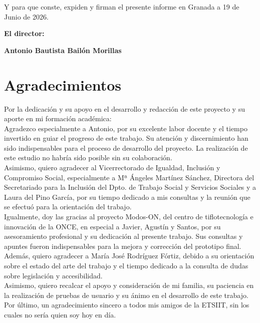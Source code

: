 \vspace{0.5cm}

Y para que conste, expiden y firman el presente informe en Granada a 19 de Junio de 2026.

\vspace{1cm}

\textbf{El director: }

\vspace{5cm}

\noindent \textbf{Antonio Bautista Bailón Morillas}
\newpage
\thispagestyle{empty}
\chapter*{Agradecimientos}

\thispagestyle{empty}
Por la dedicación y su apoyo en el desarrollo y redacción de este proyecto y su aporte en mi formación académica:\\

Agradezco especialmente a Antonio, por su excelente labor docente y el tiempo invertido en guiar el progreso de este trabajo. Su atención y discernimiento han sido indispensables para el proceso de desarrollo del proyecto. La realización de este estudio no habría sido posible sin su colaboración.\\

Asimismo, quiero agradecer al Vicerrectorado de Igualdad, Inclusión y Compromiso Social, especialmente a Mª Ángeles Martínez Sánchez, Directora del Secretariado para la Inclusión del Dpto. de Trabajo Social y Servicios Sociales y a Laura del Pino García, por su tiempo dedicado a mis consultas y la reunión que se efectuó para la orientación del trabajo.\\

Igualmente, doy las gracias al proyecto Modos-ON, del centro de tiflotecnología e innovación de la ONCE, en especial a Javier, Agustín y Santos, por su asesoramiento profesional y su dedicación al presente trabajo. Sus consultas y apuntes fueron indispensables para la mejora y corrección del prototipo final.\\

Además, quiero agradecer a María José Rodríguez Fórtiz, debido a su orientación sobre el estado del arte del trabajo y el tiempo dedicado a la consulta de dudas sobre legislación y accesibilidad.\\

Asimismo, quiero recalcar el apoyo y consideración de mi familia, su paciencia en la realización de pruebas de usuario y su ánimo en el desarrollo de este trabajo. \\

Por último, un agradecimiento sincero a todos mis amigos de la ETSIIT, sin los cuales no sería quien soy hoy en día.\\



